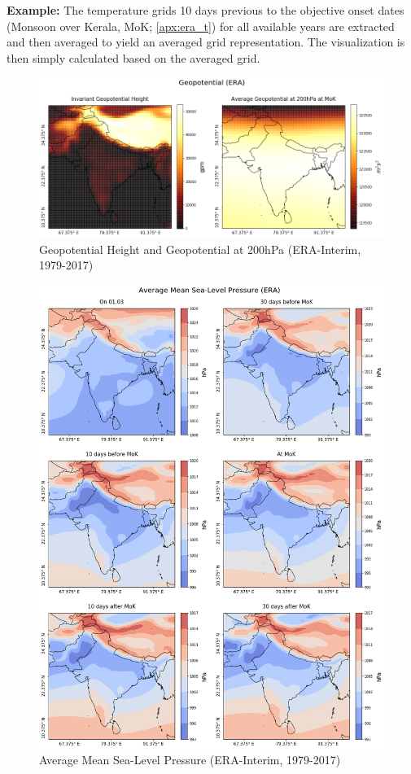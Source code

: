 \textbf{Example:} The temperature grids 10 days previous to the objective onset dates (Monsoon over Kerala, MoK; \ref{apx:era_t}) for all available years are extracted and then averaged to yield an averaged grid representation. The visualization is then simply calculated based on the averaged grid.

\begin{figure}[h]
  \centering
  \includegraphics[width=\linewidth]{./99_appendix/img/geopotential}
  \caption{Geopotential Height and Geopotential at 200hPa (ERA-Interim, 1979-2017)}
  \label{apx:era_geopotential}
\end{figure}

\begin{figure}[h]
  \centering
  \includegraphics[width=\linewidth]{./99_appendix/img/msl_avg}
  \caption{Average Mean Sea-Level Pressure (ERA-Interim, 1979-2017)}
  \label{apx:era_msl}
\end{figure}


